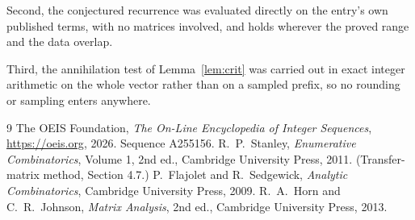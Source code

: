 \documentclass[11pt,a4paper]{article}
\theoremstyle{plain}
\theoremstyle{definition}
\begin{document}
Second, the conjectured recurrence was evaluated directly on the entry's own published terms,
with no matrices involved, and holds wherever the proved range and the data overlap.

Third, the annihilation test of Lemma~\ref{lem:crit} was carried out in exact integer
arithmetic on the whole vector rather than on a sampled prefix, so no rounding or sampling
enters anywhere.

\begin{thebibliography}{9}
 The OEIS Foundation, \emph{The On-Line Encyclopedia of Integer
Sequences}, \url{https://oeis.org}, 2026. Sequence A255156.
 R.~P.~Stanley, \emph{Enumerative Combinatorics}, Volume 1, 2nd ed.,
Cambridge University Press, 2011. (Transfer-matrix method, Section 4.7.)
 P.~Flajolet and R.~Sedgewick, \emph{Analytic Combinatorics}, Cambridge
University Press, 2009.
 R.~A.~Horn and C.~R.~Johnson, \emph{Matrix Analysis}, 2nd ed., Cambridge
University Press, 2013.
\end{thebibliography}
\end{document}
